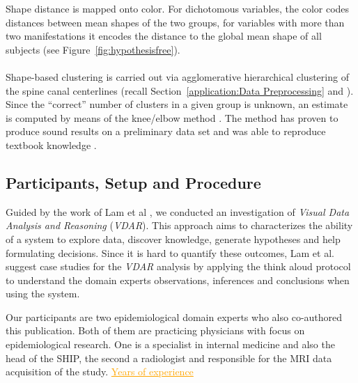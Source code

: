 \documentclass[journal]{style/vgtc} 			          %
\newcommand{\com}[1]{\textcolor{orange}{\uline{#1}}}
\begin{document}
Shape distance is mapped onto color.
%
For dichotomous variables, the color codes distances between mean shapes of the two groups, for variables with more than two manifestations it encodes the distance to the global mean shape of all subjects (see Figure~\ref{fig:hypothesisfree}).
\\\\
Shape-based clustering is carried out via agglomerative hierarchical clustering of the spine canal centerlines (recall Section~\ref{application:Data Preprocessing} and \cite{Klemm2013VMV}).
%
Since the ``correct'' number of clusters in a given group is unknown, an estimate is computed by means of the knee/elbow method \cite{Salvador2004}.
%
The method has proven to produce sound results on a preliminary data set and was able to reproduce textbook knowledge \cite{Klemm2013VMV}.
\subsection{Participants, Setup and Procedure}
%
%
Guided by the work of Lam et al \cite{Lam2012}, we conducted an investigation of \emph{Visual Data Analysis and Reasoning} (\emph{VDAR}).
%
This approach aims to characterizes the ability of a system to explore data, discover knowledge, generate hypotheses and help formulating decisions.
%
Since it is hard to quantify these outcomes, Lam et al. suggest case studies for the \emph{VDAR} analysis by applying the think aloud protocol to understand the domain experts observations, inferences and conclusions when using the system.

Our participants are two epidemiological domain experts who also co-authored this publication.
%
Both of them are practicing physicians with focus on epidemiological research.
%
One is a specialist in internal medicine and also the head of the SHIP, the second a radiologist and responsible for the MRI data acquisition of the study. \com{Years of experience} %
%
%
\end{document}
